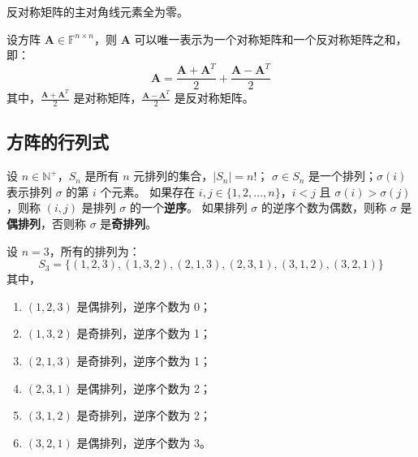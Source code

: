 \begin{corollary}
    反对称矩阵的主对角线元素全为零。
\end{corollary}

\begin{corollary}
    设方阵 $\mathbf{A} \in \mathbb{F}^{n \times n}$，则 $\mathbf{A}$ 可以唯一表示为一个对称矩阵和一个反对称矩阵之和，即：
    \[
        \mathbf{A} = \frac{\mathbf{A} + \mathbf{A}^T}{2} + \frac{\mathbf{A} - \mathbf{A}^T}{2}
    \]
    其中，$\frac{\mathbf{A} + \mathbf{A}^T}{2}$ 是对称矩阵，$\frac{\mathbf{A} - \mathbf{A}^T}{2}$ 是反对称矩阵。
    \label{prop:symmetric_decomposition}
\end{corollary}

\vspace{1em}
\subsection{方阵的行列式}

\begin{definition}[排列 Permutation]
    设 $n\in\mathbb{N}^+$，$S_n$ 是所有 $n$ 元排列的集合，$|S_n|=n!$；
    $\sigma \in S_n$ 是一个排列；$\sigma(i)$ 表示排列 $\sigma$ 的第 $i$ 个元素。
    如果存在 $i,j\in\{1,2,\ldots,n\}$，$i<j$ 且 $\sigma(i)>\sigma(j)$，则称 $(i,j)$ 是排列 $\sigma$ 的一个\textbf{逆序}。
    如果排列 $\sigma$ 的逆序个数为偶数，则称 $\sigma$ 是\textbf{偶排列}，否则称 $\sigma$ 是\textbf{奇排列}。
\end{definition}

\begin{example}
    设 $n=3$，所有的排列为：
    \[
        S_3 = \{(1,2,3),(1,3,2),(2,1,3),(2,3,1),(3,1,2),(3,2,1)\}
    \]
    其中，
    \begin{enumerate}
        \item $(1,2,3)$ 是偶排列，逆序个数为 0；
        \item $(1,3,2)$ 是奇排列，逆序个数为 1；
        \item $(2,1,3)$ 是奇排列，逆序个数为 1；
        \item $(2,3,1)$ 是偶排列，逆序个数为 2；
        \item $(3,1,2)$ 是奇排列，逆序个数为 2；
        \item $(3,2,1)$ 是偶排列，逆序个数为 3。
    \end{enumerate}
\end{example}
\vspace{1em}

